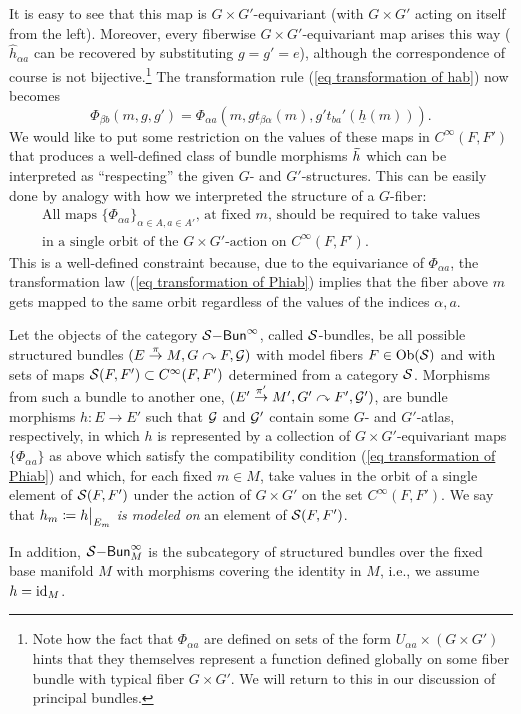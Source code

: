 It is easy to see that this map is $G\times G'$-equivariant (with $G\times G'$ acting on itself from the left). Moreover, every fiberwise $G\times G'$-equivariant map arises this way ($\hat{h}_{\alpha a}$ can be recovered by substituting $g=g'=e$), although the correspondence of course is not bijective.\footnote{Note how the fact that $\Phi_{\alpha a}$ are defined on sets of the form $U_{\alpha a}\times (G\times G')$ hints that they themselves represent a function defined globally on some fiber bundle with typical fiber $G\times G'$. We will return to this in our discussion of principal bundles.} The transformation rule (\ref{eq transformation of hab}) now becomes
\[\boxed{\Phi_{\beta b}(m,g,g')=\Phi_{\alpha a}\left(m,gt_{\beta\alpha}(m),g't_{ba}'(\underline{h}(m))\right).}\label{eq transformation of Phiab}\]
We would like to put some restriction on the values of these maps in $C^\infty(F,F')$ that produces a well-defined class of bundle morphisms $\wt h$ which can be interpreted as ``respecting'' the given $G$- and $G'$-structures. This can be easily done by analogy with how we interpreted the structure of a $G$-fiber:
\begin{gather}
    \text{All maps }\{\Phi_{\alpha a}\}_{\alpha\in A,a\in A'}\text{, at fixed }m\text{, should be required to take values}\\
    \text{in a single orbit of the }G\times G'\text{-action on }C^\infty(F,F').
\end{gather}
This is a well-defined constraint because, due to the equivariance of $\Phi_{\alpha a}$, the transformation law (\ref{eq transformation of Phiab}) implies that the fiber above $m$ gets mapped to the same orbit regardless of the values of the indices $\alpha,a$.

\begin{defn}\label{def S-bundle}
    Let the objects of the category $\mathcal{S}\mathsf{-Bun}^\infty$, called $\mathcal{S}$-bundles, be all possible structured bundles $(E\overset{\pi}{\to}M,G\curvearrowright F,\mathcal{G})$ with model fibers $F\in\operatorname{Ob}(\mathcal{S})$ and with sets of maps $\mathcal{S}(F,F')\subset C^\infty(F,F')$ determined from a category $\mathcal{S}$. Morphisms from such a bundle to another one, $(E'\overset{\pi'}{\to}M',G'\curvearrowright F',\mathcal{G}')$, are bundle morphisms $h:E\to E'$ such that $\mathcal{G}$ and $\mathcal{G}'$ contain some $G$- and $G'$-atlas, respectively, in which $h$ is represented by a collection of $G\times G'$-equivariant maps $\{\Phi_{\alpha a}\}$ as above which satisfy the compatibility condition (\ref{eq transformation of Phiab}) and which, for each fixed $m\in M$, take values in the orbit of a single element of $\mathcal{S}(F,F')$ under the action of $G\times G'$ on the set $C^\infty(F,F')$. We say that $h_m\coloneqq \restr{h}{E_m}$ \emph{is modeled on} an element of $\mathcal{S}(F,F')$.

    In addition, ${\mathcal{S}\mathsf{-Bun}}_M^\infty$ is the subcategory of structured bundles over the fixed base manifold $M$ with morphisms covering the identity in $M$, i.e., we assume $h=\operatorname{id}_M$.
\end{defn}

